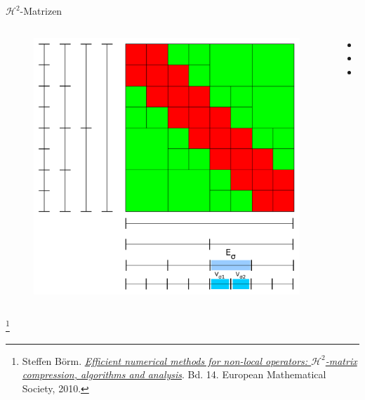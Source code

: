 \documentclass[10pt]{beamer}
\let\svthefootnote\thefootnote
\begin{document}
\begin{frame}{\(\mathcal{H}^2\)-Matrizen}
\begin{columns}
\begin{figure}
\begin{overprint}
          \centering\includegraphics[width=\linewidth]{figures/fg-h2-matrix-6.pdf}
        \end{overprint}
      \end{figure}
      \begin{itemize}
        \item {}
        \item {}
        \item {}
      \end{itemize}
  \end{columns}

  \footnotesize
  \let\thefootnote\relax\footnote{Steffen B{\"o}rm.
  \href{https://books.google.de/books/about/Efficient_Numerical_Methods_for_Non_loca.html?id=awMabNC9DTkC&redir_esc=y}
  {\textit{Efficient numerical methods for non-local operators: \(
   \mathcal{H}^{2} \)-matrix compression, algorithms and analysis}}. Bd. 14.  
   European Mathematical Society, 2010.}
  \addtocounter{footnote}{-1}\let\thefootnote\svthefootnote\relax
  \normalsize
\end{frame}
\end{document}
